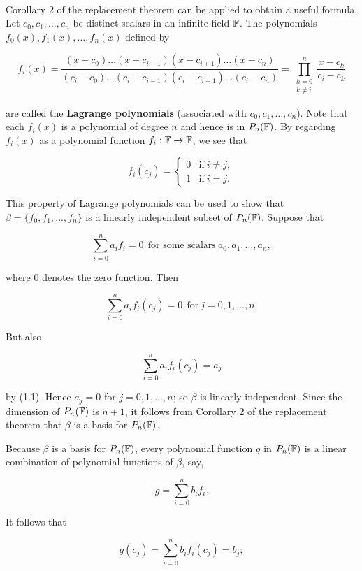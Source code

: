 \begin{definition}
	\hfill\\
	Corollary 2 of the replacement theorem can be applied to obtain a useful formula. Let $c_0, c_1, \dots, c_n$ be distinct scalars in an infinite field $\mathbb{F}$. The polynomials $f_0(x), f_1(x), \dots, f_n(x)$ defined by

	\[f_i(x) = \frac{(x-c_0)\dots(x-c_{i-1})(x-c_{i+1})\dots(x-c_n)}{(c_i - c_0)\dots(c_i-c_{i-1})(c_i-c_{i+1})\dots(c_i-c_n)} = \prod_{\substack{k=0 \\ k \neq i}}^{n} \frac{x-c_k}{c_i - c_k}\]

	are called the \textbf{Lagrange polynomials} (associated with $c_0, c_1, \dots, c_n$). Note that each $f_i(x)$ is a polynomial of degree $n$ and hence is in $P_n(\mathbb{F})$. By regarding $f_i(x)$ as a polynomial function $f_i: \mathbb{F} \to \mathbb{F}$, we see that

	\begin{equation}
		f_i(c_j) = \begin{cases}
			0 & \text{if}\ i \neq j, \\
			1 & \text{if}\ i = j.
		\end{cases}
	\end{equation}

	This property of Lagrange polynomials can be used to show that $\beta = \{f_0, f_1, \dots, f_n\}$ is a linearly independent subset of $P_n(\mathbb{F})$. Suppose that

	\[\sum_{i=0}^{n}a_if_i = 0\ \ \text{for some scalars}\ a_0, a_1, \dots, a_n,\]

	where $0$ denotes the zero function. Then

	\[\sum_{i=0}^{n}a_if_i(c_j)=0\ \ \text{for}\ j=0, 1, \dots, n.\]

	But also

	\[\sum_{i=0}^{n}a_if_i(c_j)=a_j\]

	by (1.1). Hence $a_j = 0$ for $j = 0, 1, \dots, n$; so $\beta$ is linearly independent. Since the dimension of $P_n(\mathbb{F})$ is $n + 1$, it follows from Corollary 2 of the replacement theorem that $\beta$ is a basis for $P_n(\mathbb{F})$.

	Because $\beta$ is a basis for $P_n(\mathbb{F})$, every polynomial function $g$ in $P_n(\mathbb{F})$ is a linear combination of polynomial functions of $\beta$, say,

	\[g = \sum_{i=0}^{n}b_if_i.\]

	It follows that

	\[g(c_j)=\sum_{i=0}^{n}b_if_i(c_j)=b_j;\]


\end{definition}
